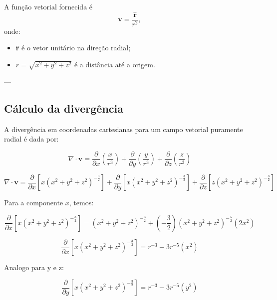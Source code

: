 \documentclass[a4paper,12pt]{article}
\begin{document}
A função vetorial fornecida é 
\begin{equation}
\mathbf{v} = \frac{\hat{\mathbf{r}}}{r^2},
\end{equation}
onde:
\begin{itemize}
    \item \( \hat{\mathbf{r}} \) é o vetor unitário na direção radial;
    \item \( r = \sqrt{x^2 + y^2 + z^2} \) é a distância até a origem.
\end{itemize}

---

\subsection*{Cálculo da divergência}

A divergência em coordenadas cartesianas para um campo vetorial puramente radial é dada por:

\begin{equation}
\nabla \cdot \mathbf{v} = \frac{\partial}{\partial x}\left( \frac{x}{r^3}\right) + \frac{\partial}{\partial y}\left( \frac{y}{r^3}\right) + \frac{\partial}{\partial z}\left( \frac{z}{r^3}\right)
\end{equation}

\begin{equation}
    \nabla \cdot \mathbf{v} = \frac{\partial}{\partial x}\left[x(x^2+y^2+z^2)^{-\frac{3}{2}}\right] + \frac{\partial}{\partial y}\left[x(x^2+y^2+z^2)^{-\frac{3}{2}}\right] + \frac{\partial}{\partial z}\left[z(x^2+y^2+z^2)^{-\frac{3}{2}}\right]
\end{equation}

Para a componente \( x \), temos:

\begin{equation}
    \frac{\partial}{\partial x}\left[x(x^2+y^2+z^2)^{-\frac{3}{2}}\right] = (x^2+y^2+z^2)^{-\frac{3}{2}} + \left(-\frac{3}{2}\right)(x^2+y^2+z^2)^{-\frac{5}{2}}\left(2x^2\right)
\end{equation}

\begin{equation}
    \frac{\partial}{\partial x}\left[x(x^2+y^2+z^2)^{-\frac{3}{2}}\right] = r^{-3} - 3r^{-5}\left(x^2\right)
\end{equation}

Analogo para y e z:

\begin{equation}
    \frac{\partial}{\partial y}\left[x(x^2+y^2+z^2)^{-\frac{3}{2}}\right] = r^{-3} - 3r^{-5}\left(y^2\right)
\end{equation}
\end{document}
